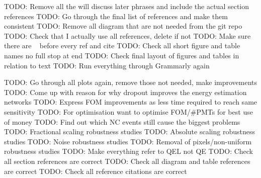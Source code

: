 TODO: Remove all the will discuss later phrases and include the actual section references
TODO: Go through the final list of references and make them consistent
TODO: Remove all diagram that are not needed from the git repo
TODO: Check that I actually use all references, delete if not
TODO: Make sure there are ~ before every ref and cite
TODO: Check all short figure and table names no full stop at end
TODO: Check final layout of figures and tables in relation to text
TODO: Run everything through Grammarly again

TODO: Go through all plots again, remove those not needed, make improvements
TODO: Come up with reason for why dropout improves the energy estimation networks
TODO: Express FOM improvements as less time required to reach same sensitivity
TODO: For optimisation want to optimise FOM/#PMTs for best use of money
TODO: Find out which NC events still cause the biggest problems
TODO: Fractional scaling robustness studies
TODO: Absolute scaling robustness studies
TODO: Noise robustness studies
TODO: Removal of pixels/non-uniform robustness studies
TODO: Make everything refer to QEL not QE
TODO: Check all section references are correct
TODO: Check all diagram and table references are correct
TODO: Check all reference citations are correct